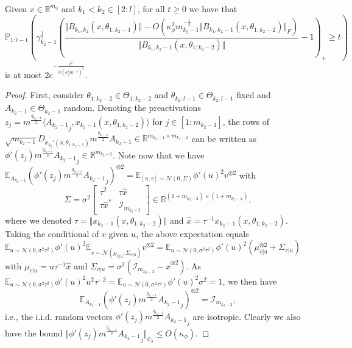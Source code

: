 \documentclass[twoside,11pt]{article}
\newcommand{\R}{\mathbb{R}}
\newcommand{\E}{\mathbb{E}}
\newcommand{\Prob}{\mathbb{P}}
\newcommand{\Id}{\mathcal{I}}
\begin{document}
\begin{proposition}\label{prop:backprop_norm_concentration}~\\
Given $x \in \R^{m_0}$ and $k_1 < k_2 \in [2:l]$, for all $t \geq 0$ we have that
\[
\Prob_{1:l-1}\left(
\gamma_{k_2-1}^{\frac{1}{2}} \left( \frac{\Vert B_{k_1, k_2}(x, \theta_{1 : k_2-1}) \Vert - O\left( \kappa_\phi^2 m_{k_2-1}^{-\frac{1}{2}} \Vert B_{k_1, k_2-1}(x, \theta_{1 : k_2-2}) \Vert_F \right)}{\Vert B_{k_1, k_2-1}(x, \theta_{1 : k_2-2}) \Vert} - 1 \right)_+ \geq t
\right)
\]
is at most $2e^{-\frac{t^2}{O\left( \kappa_\phi^2 m^{-\frac{1}{2}} \right)^2}}$.
\end{proposition}
\begin{proof}
First, consider $\theta_{1:k_2-2} \in \Theta_{1:k_2-2}$ and $\theta_{k_2:l-1} \in \Theta_{k_2:l-1}$ fixed and $A_{k_2-1} \in \Theta_{k_2-1}$ random. Denoting the preactivations $z_j = m^{\frac{q_{k_2-1}}{2}} \langle {A_{k_2-1}}_j, x_{k_2-1}(x, \theta_{1 : k_2-2}) \rangle$ for $j \in [1:m_{k_2-1}]$, the rows of $\sqrt{m_{k_2-1}} D_{x_{k_2}'(x,\theta_{1 : k_2-1})} m^{\frac{q_{k_2-1}}{2}} A_{k_2-1} \in \R^{m_{k_2-1} \times m_{k_2-2}}$ can be written as $\phi'(z_j) m^{\frac{q_{k_2-1}}{2}} {A_{k_2-1}}_j \in \R^{m_{k_2-2}}$. Note now that we have $\E_{A_{k_2-1}} (\phi'(z_j) m^{\frac{q_{k_2-1}}{2}} {A_{k_2-1}}_j)^{\otimes 2} = \E_{[u,v] \sim \mathcal{N}(0,\Sigma)} \phi'(u)^2 v^{\otimes 2}$ with
\[
\Sigma = \sigma^2 \left[ \begin{smallmatrix} \tau^2 & \tau \hat{x} \\ \tau \hat{x}^* & \Id_{m_{k_2-2}} \end{smallmatrix} \right] \in \R^{(1+m_{k_2-2}) \times (1+m_{k_2-2})},
\]
where we denoted $\tau = \Vert x_{k_2-1}(x, \theta_{1 : k_2-2}) \Vert$ and $\hat{x} = \tau^{-1} x_{k_2-1}(x, \theta_{1 : k_2-2})$. Taking the conditional of $v$ given $u$, the above expectation equals $\E_{u \sim \mathcal{N}(0,\sigma^2 \tau^2)} \phi'(u)^2 \E_{v \sim \mathcal{N}(\mu_{v \vert u},\Sigma_{v \vert u})} v^{\otimes 2} = \E_{u \sim \mathcal{N}(0,\sigma^2 \tau^2)} \phi'(u)^2 (\mu_{v \vert u}^{\otimes 2} + \Sigma_{v \vert u})$ with $\mu_{v \vert u} = u \tau^{-1} \hat{x}$ and $\Sigma_{v \vert u} = \sigma^2 (\Id_{m_{k_2-2}} - \hat{x}^{\otimes 2})$. As $\E_{u \sim \mathcal{N}(0,\sigma^2 \tau^2)} \phi'(u)^2 u^2 \tau^{-2} = \E_{u \sim \mathcal{N}(0,\sigma^2 \tau^2)} \phi'(u)^2 \sigma^2 = 1$, we then have 
\[
\E_{A_{k_2-1}} (\phi'(z_j) m^{\frac{q_{k_2-1}}{2}} {A_{k_2-1}}_j)^{\otimes 2} = \Id_{m_{k_2-2}},
\]
i.e., the i.i.d. random vectors $\phi'(z_j) m^{\frac{q_{k_2-1}}{2}} {A_{k_2-1}}_j$ are isotropic. Clearly we also have the bound $\Vert \phi'(z_j) m^{\frac{q_{k_2-1}}{2}} {A_{k_2-1}}_j \Vert_{\psi_2} \leq O(\kappa_\phi)$. 


\end{proof}
\end{document}
